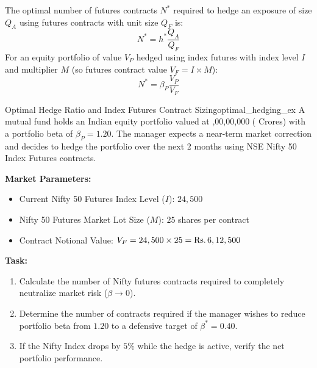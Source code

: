 The optimal number of futures contracts $N^*$ required to hedge an exposure of size $Q_A$ using futures contracts with unit size $Q_F$ is:
\begin{equation}
N^* = h^* \frac{Q_A}{Q_F}
\end{equation}
For an equity portfolio of value $V_P$ hedged using index futures with index level $I$ and multiplier $M$ (so futures contract value $V_F = I \times M$):
\begin{equation}
N^* = \beta_P \frac{V_P}{V_F}
\end{equation}

\begin{example}{Optimal Hedge Ratio and Index Futures Contract Sizing}{optimal_hedging_ex}
A mutual fund holds an Indian equity portfolio valued at ,00,00,000 ( Crores) with a portfolio beta of $\beta_P = 1.20$. The manager expects a near-term market correction and decides to hedge the portfolio over the next 2 months using NSE Nifty 50 Index Futures contracts.

\textbf{Market Parameters:}
\begin{itemize}[leftmargin=1.5em, noitemsep]
    \item Current Nifty 50 Futures Index Level ($I$): $24,500$
    \item Nifty 50 Futures Market Lot Size ($M$): $25$ shares per contract
    \item Contract Notional Value: $V_F = 24,500 \times 25 = \text{Rs.}\, 6,12,500$
\end{itemize}

\textbf{Task:}
\begin{enumerate}[leftmargin=1.2em, itemsep=2pt]
    \item Calculate the number of Nifty futures contracts required to completely neutralize market risk ($\beta \rightarrow 0$).
    \item Determine the number of contracts required if the manager wishes to reduce portfolio beta from $1.20$ to a defensive target of $\beta^* = 0.40$.
    \item If the Nifty Index drops by $5\%$ while the hedge is active, verify the net portfolio performance.
\end{enumerate}


\end{example}
